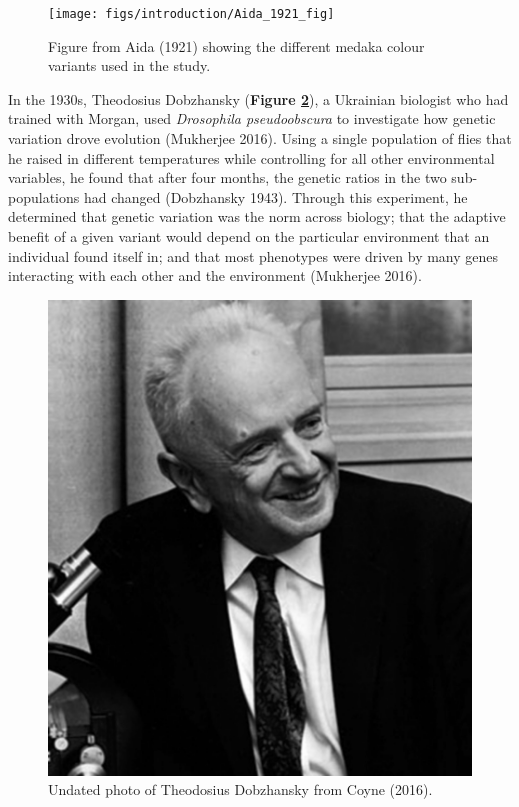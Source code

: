 \documentclass[
]{book}
\begin{document}
\begin{figure}

{\centering \texttt{[image: figs/introduction/Aida\_1921\_fig]} 

}

\caption{Figure from Aida (1921) showing the different medaka colour variants used in the study.}\label{fig:aida-fig}
\end{figure}

In the 1930s, Theodosius Dobzhansky (\textbf{Figure \ref{fig:dobzhansky}}), a Ukrainian biologist who had trained with Morgan, used \emph{Drosophila pseudoobscura} to investigate how genetic variation drove evolution (Mukherjee 2016). Using a single population of flies that he raised in different temperatures while controlling for all other environmental variables, he found that after four months, the genetic ratios in the two sub-populations had changed (Dobzhansky 1943). Through this experiment, he determined that genetic variation was the norm across biology; that the adaptive benefit of a given variant would depend on the particular environment that an individual found itself in; and that most phenotypes were driven by many genes interacting with each other and the environment (Mukherjee 2016).



\begin{figure}

{\centering \includegraphics[width=0.6\linewidth]{figs/introduction/Dobzhansky} 

}

\caption{Undated photo of Theodosius Dobzhansky from Coyne (2016).}\label{fig:dobzhansky}
\end{figure}
\end{document}
